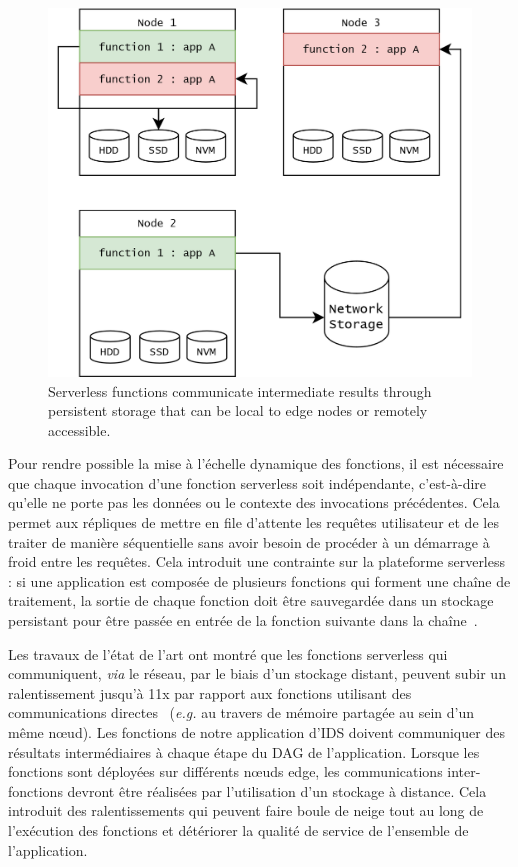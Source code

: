 \begin{figure}[!ht]
    \centering
    \includegraphics[width=0.8\columnwidth]{5_Chapitre5/figures/function-communications.png}
    \caption{Serverless functions communicate intermediate results through persistent storage that can be local to edge nodes or remotely accessible.}
    \label{figure:herocache-function-communications}
\end{figure}

Pour rendre possible la mise à l'échelle dynamique des fonctions, il est nécessaire que chaque invocation d'une fonction serverless soit indépendante, c'est-à-dire qu'elle ne porte pas les données ou le contexte des invocations précédentes. Cela permet aux répliques de mettre en file d'attente les requêtes utilisateur et de les traiter de manière séquentielle sans avoir besoin de procéder à un démarrage à froid entre les requêtes. Cela introduit une contrainte sur la plateforme serverless : si une application est composée de plusieurs fonctions qui forment une chaîne de traitement, la sortie de chaque fonction doit être sauvegardée dans un stockage persistant pour être passée en entrée de la fonction suivante dans la chaîne~\cite{mullerLambadaInteractiveData2020}.

Les travaux de l'état de l'art ont montré que les fonctions serverless qui communiquent, \textit{via} le réseau, par le biais d'un stockage distant, peuvent subir un ralentissement jusqu'à 11x par rapport aux fonctions utilisant des communications directes~\cite{wawrzoniakBoxerDataAnalytics2021a} (\textit{e.g.} au travers de mémoire partagée au sein d'un même nœud). Les fonctions de notre application d'IDS doivent communiquer des résultats intermédiaires à chaque étape du DAG de l'application. Lorsque les fonctions sont déployées sur différents nœuds edge, les communications inter-fonctions devront être réalisées par l'utilisation d'un stockage à distance. Cela introduit des ralentissements qui peuvent faire boule de neige tout au long de l'exécution des fonctions et détériorer la qualité de service de l'ensemble de l'application.

